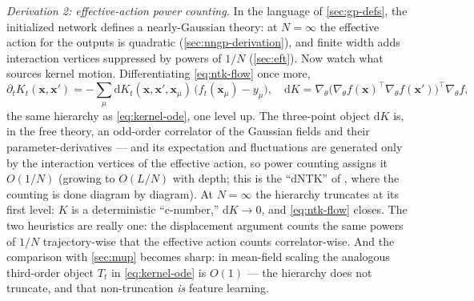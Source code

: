 \documentclass[11pt]{article}
\newcommand{\bv}[1]{\boldsymbol{#1}}
\begin{document}
\emph{Derivation 2: effective-action power counting.} In the language of
\cref{sec:gp-defs}, the initialized network defines a nearly-Gaussian
theory: at $N = \infty$ the effective action for the outputs is quadratic
(\cref{sec:nngp-derivation}), and finite width adds interaction vertices
suppressed by powers of $1/N$ (\cref{sec:eft}). Now watch what sources
kernel motion. Differentiating \cref{eq:ntk-flow} once more,
\begin{equation}
  \label{eq:dntk}
  \partial_t K_t(\bv{x},\bv{x}')
  = -\sum_\mu \mathrm{d}K_t(\bv{x},\bv{x}',\bv{x}_\mu)\,
  \bigl(f_t(\bv{x}_\mu) - y_\mu\bigr),
  \quad
  \mathrm{d}K = \nabla_\theta\bigl(\nabla_\theta f(\bv{x})^{\top}
  \nabla_\theta f(\bv{x}')\bigr)^{\top}\nabla_\theta f ,
\end{equation}
the same hierarchy as \cref{eq:kernel-ode}, one level up. The
three-point object $\mathrm{d}K$ is, in the free theory, an odd-order
correlator of the Gaussian fields and their parameter-derivatives ---
and its expectation and fluctuations are generated only by the
interaction vertices of the effective action, so power counting assigns
it $O(1/N)$ (growing to $O(L/N)$ with depth; this is the ``dNTK'' of
\cite{roberts2022principles}, where the counting is done diagram by
diagram). At $N = \infty$ the hierarchy truncates at its first level:
$K$ is a deterministic ``c-number,'' $\mathrm{d}K \to 0$, and
\cref{eq:ntk-flow} closes. The two heuristics are really one: the
displacement argument counts the same powers of $1/N$ trajectory-wise
that the effective action counts correlator-wise. And the comparison
with \cref{sec:mup} becomes sharp: in mean-field scaling the analogous
third-order object $T_t$ in \cref{eq:kernel-ode} is $O(1)$ --- the
hierarchy does not truncate, and that non-truncation \emph{is} feature
learning.
\end{document}

